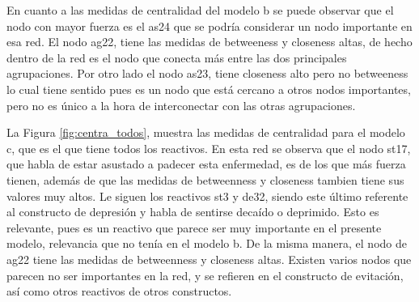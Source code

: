 \documentclass[11pt,spanish]{article}\usepackage[]{graphicx}\usepackage[]{color}
\begin{document}
En cuanto a las medidas de centralidad del modelo b se puede observar que el nodo con mayor fuerza es el as24 que se podría considerar un nodo importante en esa red. El nodo ag22, tiene las medidas de betweeness y closeness altas, de hecho dentro de la red es el nodo que conecta más entre las dos principales agrupaciones. Por otro lado el nodo as23, tiene closeness alto pero no betweeness lo cual tiene sentido pues es un nodo que está cercano a otros nodos importantes, pero no es único a la hora de interconectar con las otras agrupaciones. 

La Figura \ref{fig:centra_todos}, muestra las medidas de centralidad para el modelo c, que es el que tiene todos los reactivos. En esta red se observa que el nodo st17, que habla de estar asustado a padecer esta enfermedad, es de los que más fuerza tienen, además de que las medidas de betweenness y closeness tambien tiene sus valores muy altos. Le siguen los reactivos st3 y de32, siendo este último referente al constructo de depresión y habla de sentirse decaído o deprimido. Esto es relevante, pues es un reactivo que parece ser muy importante en el presente modelo, relevancia que no tenía en el modelo b. De la misma manera, el nodo de ag22 tiene las medidas de betweenness y closeness altas. Existen varios nodos que parecen no ser importantes en la red, y se refieren en el constructo de evitación, así como otros reactivos de otros constructos. 
\end{document}
